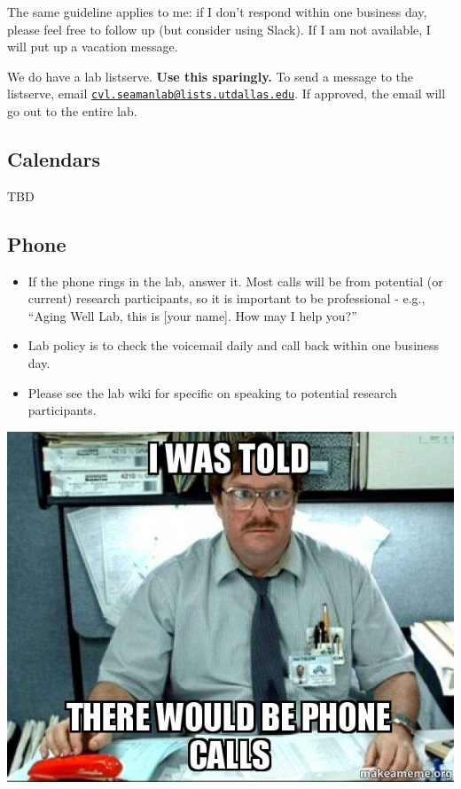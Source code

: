 \documentclass[]{book}
\begin{document}
The same guideline applies to me: if I don't respond within one business day, please feel free to follow up (but consider using Slack). If I am not available, I will put up a vacation message.

We do have a lab listserve. \textbf{Use this sparingly.} To send a message to the listserve, email \href{mailto:cvl.seamanlab@lists.utdallas.edu}{\nolinkurl{cvl.seamanlab@lists.utdallas.edu}}. If approved, the email will go out to the entire lab.

\hypertarget{calendars}{%
\subsection{Calendars}\label{calendars}}

TBD

\hypertarget{phone}{%
\subsection{Phone}\label{phone}}

\begin{itemize}
\item
  If the phone rings in the lab, answer it. Most calls will be from potential (or current) research participants, so it is important to be professional - e.g., ``Aging Well Lab, this is {[}your name{]}. How may I help you?''
\item
  Lab policy is to check the voicemail daily and call back within one business day.
\item
  Please see the lab wiki for specific on speaking to potential research participants.
\end{itemize}

\includegraphics{images/phonecalls.jpg}
\end{document}
